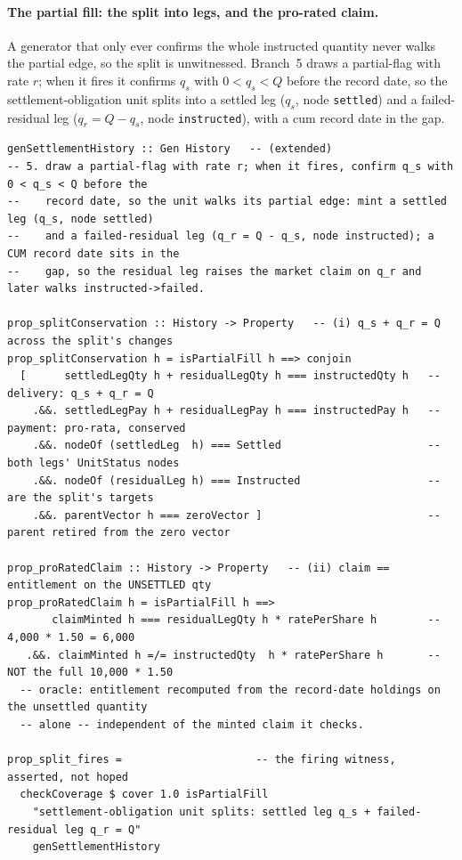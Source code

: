 \documentclass[11pt,a4paper]{article}
\begin{document}
\paragraph{The partial fill: the split into legs, and the pro-rated claim.} A generator that
only ever confirms the whole instructed quantity never walks the partial edge, so the split
is unwitnessed. Branch~5 draws a partial-flag with rate $r$; when it fires it confirms $q_s$
with $0 < q_s < Q$ before the record date, so the settlement-obligation unit splits into a
settled leg ($q_s$, node \texttt{settled}) and a failed-residual leg ($q_r = Q - q_s$, node
\texttt{instructed}), with a cum record date in the gap.

\begin{lstlisting}
genSettlementHistory :: Gen History   -- (extended)
-- 5. draw a partial-flag with rate r; when it fires, confirm q_s with 0 < q_s < Q before the
--    record date, so the unit walks its partial edge: mint a settled leg (q_s, node settled)
--    and a failed-residual leg (q_r = Q - q_s, node instructed); a CUM record date sits in the
--    gap, so the residual leg raises the market claim on q_r and later walks instructed->failed.

prop_splitConservation :: History -> Property   -- (i) q_s + q_r = Q across the split's changes
prop_splitConservation h = isPartialFill h ==> conjoin
  [      settledLegQty h + residualLegQty h === instructedQty h   -- delivery: q_s + q_r = Q
    .&&. settledLegPay h + residualLegPay h === instructedPay h   -- payment: pro-rata, conserved
    .&&. nodeOf (settledLeg  h) === Settled                       -- both legs' UnitStatus nodes
    .&&. nodeOf (residualLeg h) === Instructed                    --   are the split's targets
    .&&. parentVector h === zeroVector ]                          -- parent retired from the zero vector

prop_proRatedClaim :: History -> Property   -- (ii) claim == entitlement on the UNSETTLED qty
prop_proRatedClaim h = isPartialFill h ==>
       claimMinted h === residualLegQty h * ratePerShare h        -- 4,000 * 1.50 = 6,000
   .&&. claimMinted h =/= instructedQty  h * ratePerShare h       -- NOT the full 10,000 * 1.50
  -- oracle: entitlement recomputed from the record-date holdings on the unsettled quantity
  -- alone -- independent of the minted claim it checks.

prop_split_fires =                     -- the firing witness, asserted, not hoped
  checkCoverage $ cover 1.0 isPartialFill
    "settlement-obligation unit splits: settled leg q_s + failed-residual leg q_r = Q"
    genSettlementHistory
\end{lstlisting}
\end{document}
